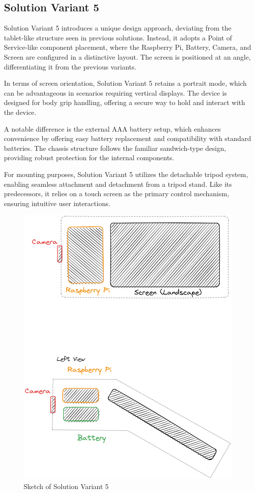 \subsection{Solution Variant 5}
Solution Variant 5 introduces a unique design approach, deviating from the tablet-like structure seen in previous solutions. Instead, it adopts a Point of Service-like component placement, where the Raspberry Pi, Battery, Camera, and Screen are configured in a distinctive layout. The screen is positioned at an angle, differentiating it from the previous variants.

In terms of screen orientation, Solution Variant 5 retains a portrait mode, which can be advantageous in scenarios requiring vertical displays. The device is designed for body grip handling, offering a secure way to hold and interact with the device.

A notable difference is the external AAA battery setup, which enhances convenience by offering easy battery replacement and compatibility with standard batteries. The chassis structure follows the familiar sandwich-type design, providing robust protection for the internal components.

For mounting purposes, Solution Variant 5 utilizes the detachable tripod system, enabling seamless attachment and detachment from a tripod stand. Like its predecessors, it relies on a touch screen as the primary control mechanism, ensuring intuitive user interactions.

\begin{figure}[H]
    \centering
    \includegraphics[scale=0.25]{texs/Part1/chapter3/image/v5.png}
    \caption{Sketch of Solution Variant 5}
    \label{fig:sketch-solution-variant-5}
\end{figure}

